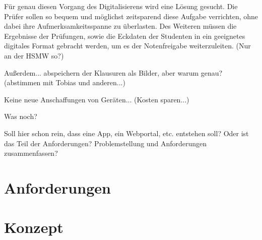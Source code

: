 \documentclass[nomenclature, draft, 150]{HSMW-Thesis}
\begin{document}
	Für genau diesen Vorgang des Digitalisierens wird eine Lösung gesucht. Die Prüfer sollen so bequem und möglichst zeitsparend diese Aufgabe verrichten, ohne dabei ihre Aufmerksamkeitsspanne zu überlasten. Des Weiteren müssen die Ergebnisse der Prüfungen, sowie die Eckdaten der Studenten in ein geeignetes digitales Format gebracht werden, um es der Notenfreigabe weiterzuleiten. (Nur an der HSMW so?) 
	
	Außerdem... abspeichern der Klausuren als Bilder, aber warum genau? (abstimmen mit Tobias und anderen...)
	
	Keine neue Anschaffungen von Geräten... (Kosten sparen...)
	
	Was noch?
	
	Soll hier schon rein, dass eine App, ein Webportal, etc. entstehen soll? Oder ist das Teil der Anforderungen? Problemstellung und Anforderungen zusammenfassen?

\chapter{Anforderungen}
	



\chapter{Konzept}
%
%
\end{document}
